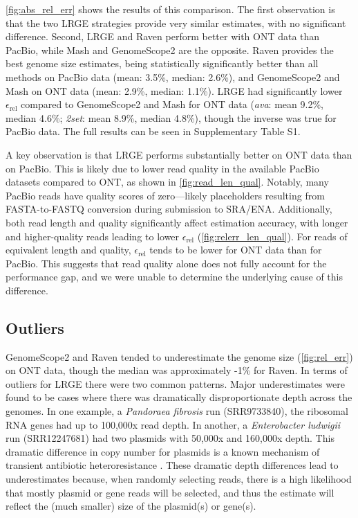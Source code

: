 \documentclass[unnumsec,webpdf,modern,large]{oup-authoring-template}
\theoremstyle{thmstyleone}%
\theoremstyle{thmstyletwo}%
\theoremstyle{thmstylethree}%
\newcommand{\lrge}{LRGE}
\newcommand{\relerr}{$\epsilon_{\text{rel}}$}
\newcommand{\ava}{\textit{ava}}
\newcommand{\twoset}{\textit{2set}}
\begin{document}
\autoref{fig:abs_rel_err} shows the results of this comparison. The first observation is that the two \lrge{} strategies provide very similar estimates, with no significant difference. Second, \lrge{} and Raven perform better with ONT data than PacBio, while Mash and GenomeScope2 are the opposite. Raven provides the best genome size estimates, being statistically significantly better than all methods on PacBio data (mean: 3.5\%, median: 2.6\%), and GenomeScope2 and Mash on ONT data (mean: 2.9\%, median: 1.1\%). \lrge{} had significantly lower \relerr{} compared to GenomeScope2 and Mash for ONT data (\ava{}: mean 9.2\%, median 4.6\%; \twoset{}: mean 8.9\%, median 4.8\%), though the inverse was true for PacBio data. The full results can be seen in Supplementary Table S1.

A key observation is that \lrge{} performs substantially better on ONT data than on PacBio. This is likely due to lower read quality in the available PacBio datasets compared to ONT, as shown in \autoref{fig:read_len_qual}. Notably, many PacBio reads have quality scores of zero—likely placeholders resulting from FASTA-to-FASTQ conversion during submission to SRA/ENA. Additionally, both read length and quality significantly affect estimation accuracy, with longer and higher-quality reads leading to lower \relerr{} (\autoref{fig:relerr_len_qual}). For reads of equivalent length and quality, \relerr{} tends to be lower for ONT data than for PacBio. This suggests that read quality alone does not fully account for the performance gap, and we were unable to determine the underlying cause of this difference.


\subsection{Outliers}
\label{sec:outliers}

GenomeScope2 and Raven tended to underestimate the genome size (\autoref{fig:rel_err}) on ONT data, though the median was approximately -1\% for Raven. In terms of outliers for \lrge{} there were two common patterns. Major underestimates were found to be cases where there was dramatically disproportionate depth across the genomes. In one example, a \textit{Pandoraea fibrosis} run (SRR9733840), the ribosomal RNA genes had up to 100,000x read depth. In another, a \textit{Enterobacter ludwigii} run (SRR12247681) had two plasmids with 50,000x and 160,000x depth. This dramatic difference in copy number for plasmids is a known mechanism of transient antibiotic heteroresistance \citep{nicoloff_three_2024}. These dramatic depth differences lead to underestimates because, when randomly selecting reads, there is a high likelihood that mostly plasmid or gene reads will be selected, and thus the estimate will reflect the (much smaller) size of the plasmid(s) or gene(s).
\end{document}
